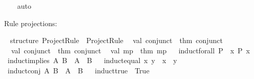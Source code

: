 \begin{isabellebody}
%
\isadelimproof
\ \ %
\endisadelimproof
%
\isatagproof
{}\isamarkupfalse%
\ auto%
\endisatagproof
{\isafoldproof}%
%
\isadelimproof
%
\endisadelimproof
%
\isadelimdocument
%
\endisadelimdocument
%
\isatagdocument
%
\isamarkuptrue%
%
\endisatagdocument
{\isafolddocument}%
%
\isadelimdocument
%
\endisadelimdocument
%
\begin{isamarkuptext}%
Rule projections:%
\end{isamarkuptext}\isamarkuptrue%
%
\isadelimML
%
\endisadelimML
%
\isatagML
{}\isamarkupfalse%
\ {\isacartoucheopen}\isanewline
structure\ Project{\isacharunderscore}{\kern0pt}Rule\ {\isacharequal}{\kern0pt}\ Project{\isacharunderscore}{\kern0pt}Rule\isanewline
{\isacharparenleft}{\kern0pt}\isanewline
\ \ val\ conjunct{}\ {\isacharequal}{\kern0pt}\ {\isacharat}{\kern0pt}{\isacharbraceleft}{\kern0pt}thm\ conjunct{}{\isacharbraceright}{\kern0pt}\isanewline
\ \ val\ conjunct{}\ {\isacharequal}{\kern0pt}\ {\isacharat}{\kern0pt}{\isacharbraceleft}{\kern0pt}thm\ conjunct{}{\isacharbraceright}{\kern0pt}\isanewline
\ \ val\ mp\ {\isacharequal}{\kern0pt}\ {\isacharat}{\kern0pt}{\isacharbraceleft}{\kern0pt}thm\ mp{\isacharbraceright}{\kern0pt}\isanewline
{\isacharparenright}{\kern0pt}{\isacharsemicolon}{\kern0pt}\isanewline
{\isacartoucheclose}%
\endisatagML
{\isafoldML}%
%
\isadelimML
%
\endisadelimML
\isanewline
\isanewline
{}\isamarkupfalse%
\isanewline
{}\isanewline
\isanewline
{}\ \isamarkupfalse%
\ {\isachardoublequoteopen}induct{\isacharunderscore}{\kern0pt}forall\ P\ {\isasymequiv}\ {\isasymforall}x{\isachardot}{\kern0pt}\ P\ x{\isachardoublequoteclose}\isanewline
{}\ \isamarkupfalse%
\ {\isachardoublequoteopen}induct{\isacharunderscore}{\kern0pt}implies\ A\ B\ {\isasymequiv}\ A\ {\isasymlongrightarrow}\ B{\isachardoublequoteclose}\isanewline
{}\ \isamarkupfalse%
\ {\isachardoublequoteopen}induct{\isacharunderscore}{\kern0pt}equal\ x\ y\ {\isasymequiv}\ x\ {\isacharequal}{\kern0pt}\ y{\isachardoublequoteclose}\isanewline
{}\ \isamarkupfalse%
\ {\isachardoublequoteopen}induct{\isacharunderscore}{\kern0pt}conj\ A\ B\ {\isasymequiv}\ A\ {\isasymand}\ B{\isachardoublequoteclose}\isanewline
{}\ \isamarkupfalse%
\ {\isachardoublequoteopen}induct{\isacharunderscore}{\kern0pt}true\ {\isasymequiv}\ True{\isachardoublequoteclose}\isanewline

\end{isabellebody}
